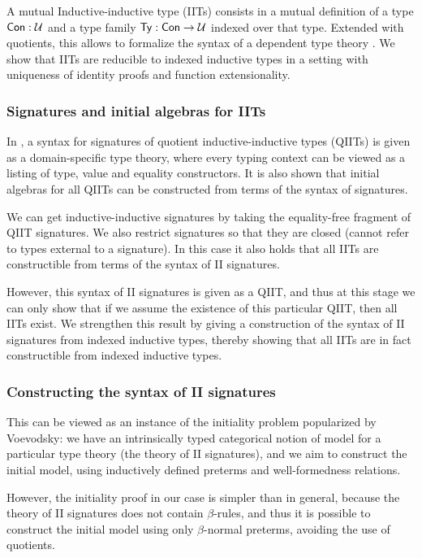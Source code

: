 

A mutual Inductive-inductive type \cite{nordvallinductive, gabephd} (IITs) consists
in a mutual definition of a type $\mathsf{Con} : \mathcal{U}$ and a type family $\mathsf{Ty} : \mathsf{Con} \to
\mathcal{U}$ indexed over that type.  Extended with quotients, this allows to formalize
the syntax of a dependent type theory \cite{ttintt}.
 We show that IITs are reducible to indexed
inductive types in a setting with uniqueness of identity proofs and function
extensionality.

\subsubsection*{Signatures and initial algebras for IITs}

In \cite{qiit}, a syntax for signatures of quotient inductive-inductive types
(QIITs) is given as a domain-specific type theory, where every typing
context can be viewed as a listing of type, value and equality constructors. It
is also shown that initial algebras for all QIITs can be constructed from terms
of the syntax of signatures.

We can get inductive-inductive signatures by taking the equality-free fragment
of QIIT signatures. We also restrict signatures so that they are closed (cannot
refer to types external to a signature). In this case it also holds that all
IITs are constructible from terms of the syntax of II signatures.

However, this syntax of II signatures is given as a QIIT, and thus at this stage
we can only show that if we assume the existence of this particular QIIT, then
all IITs exist. We strengthen this result by giving a construction of the syntax
of II signatures from indexed inductive types, thereby showing that all IITs are
in fact constructible from indexed inductive types.

\subsubsection*{Constructing the syntax of II signatures}

This can be viewed as an instance of the initiality problem popularized by
Voevodsky: we have an intrinsically typed categorical notion of model for a
particular type theory (the theory of II signatures), and we aim to construct
the initial model, using inductively defined preterms and well-formedness
relations.

However, the initiality proof in our case is simpler than in general, because
the theory of II signatures does not contain $\beta$-rules, and thus it is
possible to construct the initial model using only $\beta$-normal preterms,
avoiding the use of quotients.

